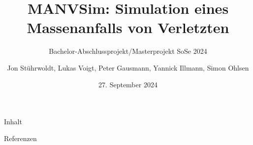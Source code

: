 \documentclass[10pt,aspectratio=169]{beamer}
\title[]{MANVSim: Simulation eines Massenanfalls von Verletzten}
\subtitle[]{Bachelor-Abschlussprojekt/Masterprojekt SoSe 2024}
\author{Jon Stührwoldt, Lukas Voigt, Peter Gausmann, Yannick Illmann, Simon Ohlsen}
\date{27. September 2024}
\begin{document}
\frame{\titlepage}

\begin{frame}{Inhalt}
	\tableofcontents[hideallsubsections]
\end{frame}







%
%

\begin{frame}[allowframebreaks]{Referenzen}
	\printbibliography
\end{frame}
\end{document}
